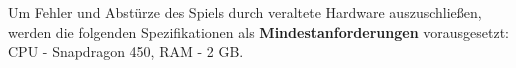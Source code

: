 Um Fehler und Abstürze des Spiels durch veraltete Hardware auszuschließen, werden die folgenden Spezifikationen als \textbf{Mindestanforderungen} vorausgesetzt:
CPU - Snapdragon 450, RAM - 2 GB.
